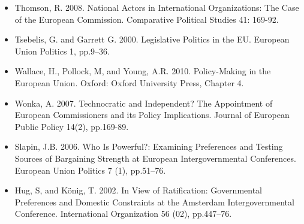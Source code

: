 \begin{itemize}
	\item Thomson, R. 2008. National Actors in International Organizations: The Case of the European Commission. Comparative Political Studies 41: 169-92.
	\item Tsebelis, G. and Garrett G. 2000. Legislative Politics in the EU. European Union Politics 1, pp.9–36.
	\item Wallace, H., Pollock, M, and Young, A.R. 2010. Policy-Making in the European Union. Oxford: Oxford University Press, Chapter 4.
	\item Wonka, A. 2007. Technocratic and Independent? The Appointment of European Commissioners and its Policy Implications. Journal of European Public Policy 14(2), pp.169-89.
	\item Slapin, J.B. 2006. Who Is Powerful?: Examining Preferences and Testing Sources of Bargaining Strength at European Intergovernmental Conferences. European Union Politics 7 (1), pp.51–76.
	\item Hug, S, and K{\"o}nig, T. 2002. In View of Ratification: Governmental Preferences and Domestic Constraints at the Amsterdam Intergovernmental Conference. International Organization 56 (02), pp.447–76.
\end{itemize}